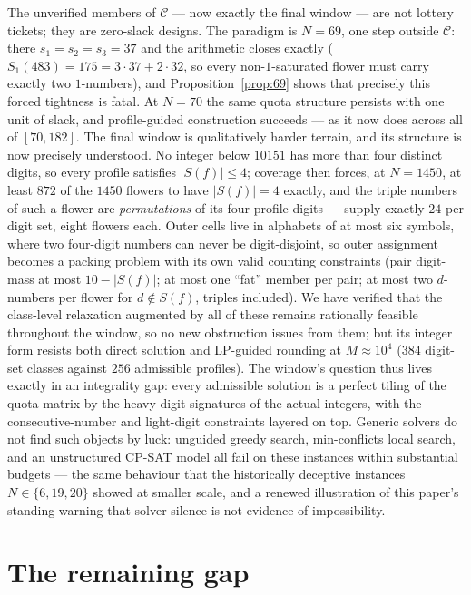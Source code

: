 \documentclass[11pt]{article}
\theoremstyle{definition}
\theoremstyle{remark}
\begin{document}
The unverified members of $\mathcal{C}$ --- now exactly the final window --- are not lottery tickets; they are zero-slack designs. The paradigm is $N=69$, one step outside $\mathcal{C}$: there $s_1=s_2=s_3=37$ and the arithmetic closes exactly ($S_1(483)=175=3\cdot 37+2\cdot 32$, so every non-$1$-saturated flower must carry exactly two $1$-numbers), and Proposition~\ref{prop:69} shows that precisely this forced tightness is fatal. At $N=70$ the same quota structure persists with one unit of slack, and profile-guided construction succeeds --- as it now does across all of $[70,182]$. The final window is qualitatively harder terrain, and its structure is now precisely understood. No integer below $10151$ has more than four distinct digits, so every profile satisfies $|S(f)|\le 4$; coverage then forces, at $N=1450$, at least $872$ of the $1450$ flowers to have $|S(f)|=4$ exactly, and the triple numbers of such a flower are \emph{permutations} of its four profile digits --- supply exactly $24$ per digit set, eight flowers each. Outer cells live in alphabets of at most six symbols, where two four-digit numbers can never be digit-disjoint, so outer assignment becomes a packing problem with its own valid counting constraints (pair digit-mass at most $10-|S(f)|$; at most one ``fat'' member per pair; at most two $d$-numbers per flower for $d\notin S(f)$, triples included). We have verified that the class-level relaxation augmented by all of these remains rationally feasible throughout the window, so no new obstruction issues from them; but its integer form resists both direct solution and LP-guided rounding at $M\approx 10^4$ ($384$ digit-set classes against $256$ admissible profiles). The window's question thus lives exactly in an integrality gap: every admissible solution is a perfect tiling of the quota matrix by the heavy-digit signatures of the actual integers, with the consecutive-number and light-digit constraints layered on top.  Generic solvers do not find such objects by luck: unguided greedy search, min-conflicts local search, and an unstructured CP-SAT model all fail on these instances within substantial budgets --- the same behaviour that the historically deceptive instances $N\in\{6,19,20\}$ showed at smaller scale, and a renewed illustration of this paper's standing warning that solver silence is not evidence of impossibility.

\section{The remaining gap}\label{sec:open}
\end{document}
